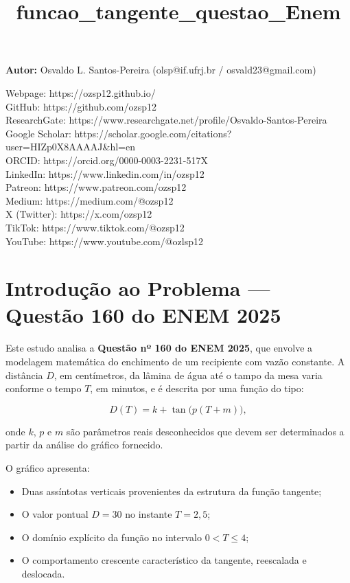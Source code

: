 \documentclass[11pt]{article}
\title{funcao\_tangente\_questao\_Enem}
\providecommand{\tightlist}{%
      \setlength{\itemsep}{0pt}\setlength{\parskip}{0pt}}
\begin{document}
    
    \maketitle
    
    

    
    \textbf{Autor:} Osvaldo L. Santos-Pereira (olsp@if.ufrj.br /
osvald23@gmail.com)

Webpage: https://ozsp12.github.io/\\
GitHub: https://github.com/ozsp12\\
ResearchGate:
https://www.researchgate.net/profile/Osvaldo-Santos-Pereira\\
Google Scholar:
https://scholar.google.com/citations?user=HIZp0X8AAAAJ\&hl=en\\
ORCID: https://orcid.org/0000-0003-2231-517X\\
LinkedIn: https://www.linkedin.com/in/ozsp12\\
Patreon: https://www.patreon.com/ozsp12\\
Medium: https://medium.com/@ozsp12\\
X (Twitter): https://x.com/ozsp12\\
TikTok: https://www.tiktok.com/@ozsp12\\
YouTube: https://www.youtube.com/@ozlsp12

    \section{Introdução ao Problema --- Questão 160 do ENEM
2025}\label{introduuxe7uxe3o-ao-problema-questuxe3o-160-do-enem-2025}

Este estudo analisa a \textbf{Questão nº 160 do ENEM 2025}, que envolve
a modelagem matemática do enchimento de um recipiente com vazão
constante. A distância \(D\), em centímetros, da lâmina de água até o
tampo da mesa varia conforme o tempo \(T\), em minutos, e é descrita por
uma função do tipo:

\[
D(T) = k + \tan\big(p(T + m)\big),
\]

onde \(k\), \(p\) e \(m\) são parâmetros reais desconhecidos que devem
ser determinados a partir da análise do gráfico fornecido.

O gráfico apresenta:

\begin{itemize}
\tightlist
\item
  Duas assíntotas verticais provenientes da estrutura da função
  tangente;\\
\item
  O valor pontual \(D=30\) no instante \(T=2{,}5\);\\
\item
  O domínio explícito da função no intervalo \(0 < T \le 4\);\\
\item
  O comportamento crescente característico da tangente, reescalada e
  deslocada.
\end{itemize}
\end{document}
